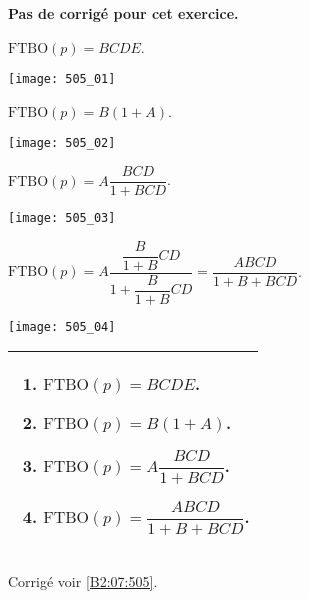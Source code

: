 \normaltrue \difficilefalse \tdifficilefalse
\correctionfalse


\setcounter{numques}{0}

\ifcorrection
\else
\textbf{Pas de corrigé pour cet exercice.}
\fi


\ifprof 
$\text{FTBO}(p) = BCDE$.
\else
\begin{center}
\texttt{[image: 505\_01]}
\end{center}
\fi
 
\ifprof 
$\text{FTBO}(p) = B\left(1+A\right)$.
\else
\begin{center}
\texttt{[image: 505\_02]}
\end{center}
\fi

\ifprof 
$\text{FTBO}(p) = A \dfrac{BCD}{1+BCD}$.
\else
\begin{center}
\texttt{[image: 505\_03]}
\end{center}
\fi

\ifprof 
$\text{FTBO}(p) = A \dfrac{\dfrac{B}{1+B}CD}{1+\dfrac{B}{1+B}CD} = \dfrac{ABCD}{1+B+BCD}$.
\else
\begin{center}
\texttt{[image: 505\_04]}
\end{center}
\fi





 

\ifprof
\else
\footnotesize
\noindent
\begin{tabular}{|p{.95\linewidth}|}
\hline
\begin{enumerate}
\item $\text{FTBO}(p) = BCDE$.
\item $\text{FTBO}(p) = B\left(1+A\right)$.
\item $\text{FTBO}(p) = A \dfrac{BCD}{1+BCD}$.
\item $\text{FTBO}(p) = \dfrac{ABCD}{1+B+BCD}$.
\end{enumerate} \\ \hline
\end{tabular}
\normalsize

\begin{flushright}
\footnotesize{Corrigé  voir \ref{B2:07:505}.}
\end{flushright}%
\fi